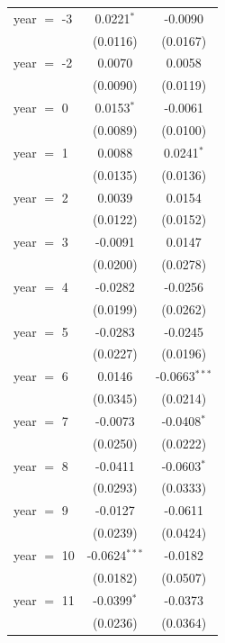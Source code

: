 \begin{tabular}{lcc}
   year $=$ -3     & 0.0221$^{*}$    & -0.0090\\   
                   & (0.0116)        & (0.0167)\\   
   year $=$ -2     & 0.0070          & 0.0058\\   
                   & (0.0090)        & (0.0119)\\   
   year $=$ 0      & 0.0153$^{*}$    & -0.0061\\   
                   & (0.0089)        & (0.0100)\\   
   year $=$ 1      & 0.0088          & 0.0241$^{*}$\\   
                   & (0.0135)        & (0.0136)\\   
   year $=$ 2      & 0.0039          & 0.0154\\   
                   & (0.0122)        & (0.0152)\\   
   year $=$ 3      & -0.0091         & 0.0147\\   
                   & (0.0200)        & (0.0278)\\   
   year $=$ 4      & -0.0282         & -0.0256\\   
                   & (0.0199)        & (0.0262)\\   
   year $=$ 5      & -0.0283         & -0.0245\\   
                   & (0.0227)        & (0.0196)\\   
   year $=$ 6      & 0.0146          & -0.0663$^{***}$\\   
                   & (0.0345)        & (0.0214)\\   
   year $=$ 7      & -0.0073         & -0.0408$^{*}$\\   
                   & (0.0250)        & (0.0222)\\   
   year $=$ 8      & -0.0411         & -0.0603$^{*}$\\   
                   & (0.0293)        & (0.0333)\\   
   year $=$ 9      & -0.0127         & -0.0611\\   
                   & (0.0239)        & (0.0424)\\   
   year $=$ 10     & -0.0624$^{***}$ & -0.0182\\   
                   & (0.0182)        & (0.0507)\\   
   year $=$ 11     & -0.0399$^{*}$   & -0.0373\\   
                   & (0.0236)        & (0.0364)\\   

\end{tabular}
